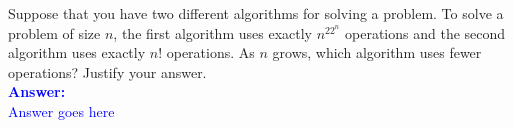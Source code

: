 \item{}
Suppose that you have two different algorithms for solving a problem. To solve
a problem of size $n$, the first algorithm uses exactly $n^22^n$ operations and
the second algorithm uses exactly $n!$ operations. As $n$ grows, which algorithm
uses fewer operations? Justify your answer.
\\[12pt]
\ifanswers
\textcolor{blue}{
\textbf{Answer:}\\[6pt]
Answer goes here
}
\newpage
\fi
